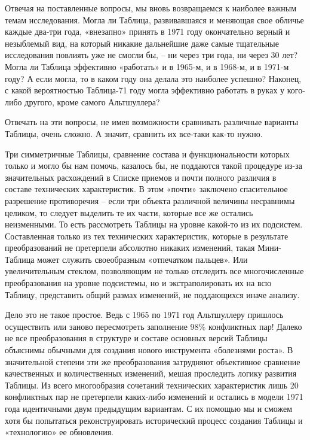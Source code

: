 \documentclass[11pt,a4paper]{article}
\begin{document}
Отвечая на поставленные вопросы, мы вновь возвращаемся к наиболее важным темам
исследования. Могла ли Таблица, развивавшаяся и меняющая свое обличье каждые
два-три года, «внезапно» принять в 1971 году окончательно верный и незыблемый
вид, на который никакие дальнейшие даже самые тщательные исследования повлиять
уже не смогли бы, -- ни через три года, ни через 30 лет? Могла ли Таблица
эффективно «работать» и в 1965-м, и в 1968-м, и в 1971-м году? А если могла,
то в каком году она делала это наиболее успешно? Наконец, с какой вероятностью
Таблица-71 году могла эффективно работать в руках у кого-либо другого, кроме
самого Альтшуллера?

Отвечать на эти вопросы, не имея возможности сравнивать различные варианты
Таблицы, очень сложно. А значит, сравнить их все-таки как-то нужно.

Три симметричные Таблицы, сравнение состава и функциональности которых только
и могло бы нам помочь, казалось бы, не поддаются такой процедуре из-за
значительных расхождений в Списке приемов и почти полного различия в составе
технических характеристик. В этом «почти» заключено спасительное разрешение
противоречия -- если три объекта различной величины несравнимы целиком, то
следует выделить те их части, которые все же остались неизменными. То есть
рассмотреть Таблицы на уровне какой-то из их подсистем. Составленная только из
тех технических характеристик, которые в результате преобразований не
претерпели абсолютно никаких изменений, такая Мини-Таблица может служить
своеобразным «отпечатком пальцев». Или увеличительным стеклом, позволяющим не
только отследить все многочисленные преобразования на уровне подсистемы, но и
экстраполировать их на всю Таблицу, представить общий размах изменений, не
поддающихся иначе анализу.

Дело это не такое простое. Ведь с 1965 по 1971 год Альтшуллеру пришлось
осуществить или заново пересмотреть заполнение 98\% конфликтных пар! Далеко не
все преобразования в структуре и составе основных версий Таблицы объяснимы
обычными для создания нового инструмента «болезнями роста». В значительной
степени эти же преобразования затрудняют объективное сравнение качественных и
количественных изменений, мешая проследить логику развития Таблицы. Из всего
многообразия сочетаний технических характеристик лишь 20 конфликтных пар не
претерпели каких-либо изменений и остались в модели 1971 года идентичными двум
предыдущим вариантам. С их помощью мы и сможем хотя бы попытаться
реконструировать исторический процесс создания Таблицы и «технологию» ее
обновления.
\end{document}

